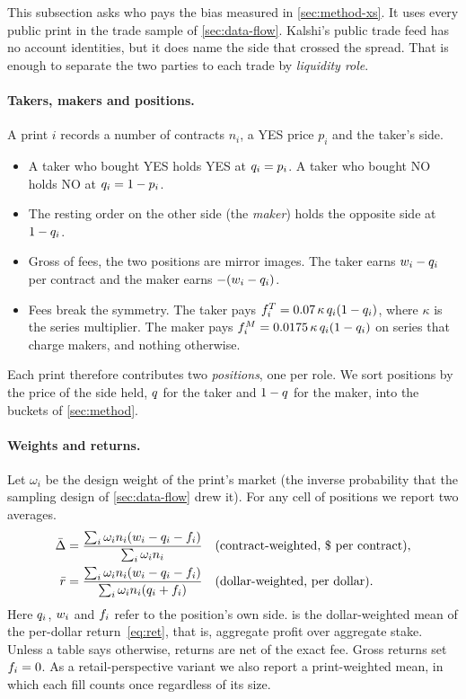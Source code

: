 This subsection asks who pays the bias measured in \cref{sec:method-xs}. It uses every public
print in the trade sample of \cref{sec:data-flow}. Kalshi's public trade feed has no account
identities, but it does name the side that crossed the spread. That is enough to separate the two
parties to each trade by \emph{liquidity role}.

\paragraph{Takers, makers and positions.} A print $i$ records a number of contracts $n_i$, a YES
price $p_i$ and the taker's side.
\begin{itemize}
  \item A taker who bought YES holds YES at $q_i=p_i$. A taker who bought NO holds NO at
  $q_i=1-p_i$.
  \item The resting order on the other side (the \emph{maker}) holds the opposite side at
  $1-q_i$.
  \item Gross of fees, the two positions are mirror images. The taker earns $w_i-q_i$ per
  contract and the maker earns $-(w_i-q_i)$.
  \item Fees break the symmetry. The taker pays $f^T_i=0.07\,\kappa\,q_i(1-q_i)$, where
  $\kappa$ is the series multiplier. The maker pays $f^M_i=0.0175\,\kappa\,q_i(1-q_i)$ on
  series that charge makers, and nothing otherwise.
\end{itemize}
Each print therefore contributes two \emph{positions}, one per role. We sort positions by the
price of the side held, $q$ for the taker and $1-q$ for the maker, into the buckets of
\cref{sec:method}.

\paragraph{Weights and returns.} Let $\omega_i$ be the design weight of the print's market
(the inverse probability that the sampling design of \cref{sec:data-flow} drew it). For any cell
of positions we report two averages.
\begin{align}
  \bar\Delta &= \frac{\sum_i \omega_i n_i(w_i-q_i-f_i)}{\sum_i\omega_i n_i}
  &&\text{(contract-weighted, \$ per contract),}\label{eq:flow-c}\\
  \bar{r} &= \frac{\sum_i \omega_i n_i(w_i-q_i-f_i)}{\sum_i\omega_i n_i(q_i+f_i)}
  &&\text{(dollar-weighted, per dollar).}\label{eq:flow-d}
\end{align}
Here $q_i$, $w_i$ and $f_i$ refer to the position's own side.  is the
dollar-weighted mean of the per-dollar return~\eqref{eq:ret}, that is, aggregate profit over
aggregate stake. Unless a table says otherwise, returns are net of the exact fee. Gross returns
set $f_i=0$. As a retail-perspective variant we also report a print-weighted mean, in which
each fill counts once regardless of its size.

